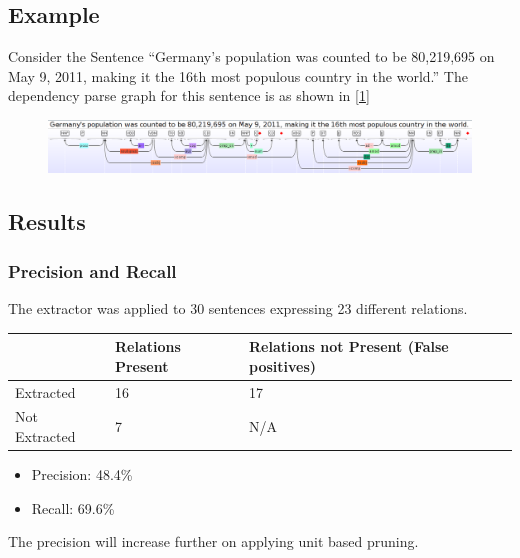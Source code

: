 \documentclass[a4paper,10pt]{article}
\begin{document}
\subsection{Example}
Consider the Sentence ``Germany's population was counted to be 80,219,695 on May 9, 2011, making it the 16th most populous country in the world.''
The dependency parse graph for this sentence is as shown in [\ref{fig:2}]
\begin{figure}[h]
 \centering
 \includegraphics[bb=0 0 1245 177,scale=0.3]{./dep4.png}
 \label{fig:2}
\end{figure}

\subsection{Results}
\subsubsection{Precision and Recall}
The extractor was applied to 30 sentences expressing 23 different relations.
\begin{tabular}{|l|l|l|}
\hline
& Relations Present & Relations not Present (False positives) \\
\hline
Extracted & 16 & 17 \\
\hline
Not Extracted & 7 & N/A \\
\hline
\end{tabular}
 \begin{itemize}
  \item Precision: 48.4\%
  \item Recall: 69.6\%
 \end{itemize}

The precision will increase further on applying unit based pruning.
\end{document}
